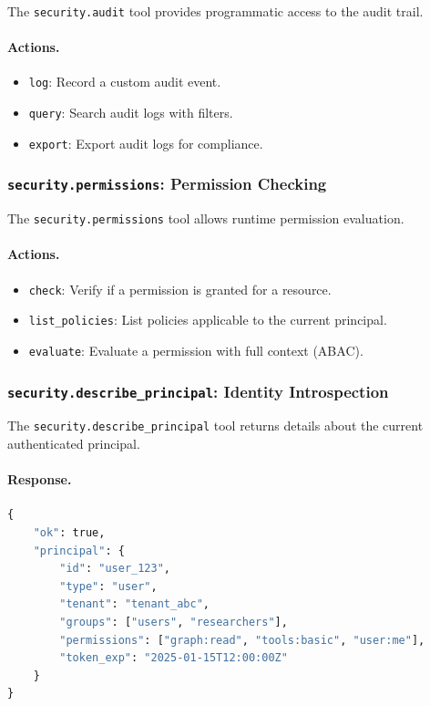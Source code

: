 The \texttt{security.audit} tool provides programmatic access to the audit trail.

\paragraph{Actions.}
\begin{itemize}
    \item \texttt{log}: Record a custom audit event.
    \item \texttt{query}: Search audit logs with filters.
    \item \texttt{export}: Export audit logs for compliance.
\end{itemize}

\subsubsection{\texttt{security.permissions}: Permission Checking}

The \texttt{security.permissions} tool allows runtime permission evaluation.

\paragraph{Actions.}
\begin{itemize}
    \item \texttt{check}: Verify if a permission is granted for a resource.
    \item \texttt{list\_policies}: List policies applicable to the current principal.
    \item \texttt{evaluate}: Evaluate a permission with full context (ABAC).
\end{itemize}

\subsubsection{\texttt{security.describe\_principal}: Identity Introspection}

The \texttt{security.describe\_principal} tool returns details about the current authenticated principal.

\paragraph{Response.}
\begin{lstlisting}[language=Python, caption={Principal description response}, label={lst:principal-describe}]
{
    "ok": true,
    "principal": {
        "id": "user_123",
        "type": "user",
        "tenant": "tenant_abc",
        "groups": ["users", "researchers"],
        "permissions": ["graph:read", "tools:basic", "user:me"],
        "token_exp": "2025-01-15T12:00:00Z"
    }
}
\end{lstlisting}

